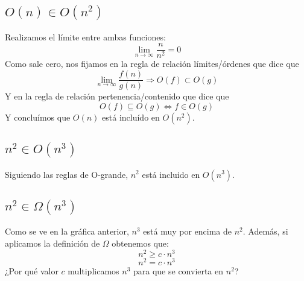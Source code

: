 \begin{twocolumn}
\subsection{$O(n) \in O(n^2)$}

Realizamos el límite entre ambas funciones:
\begin{displaymath}
\lim_{n \rightarrow \infty} \frac{n}{n^2} = 0
\end{displaymath}
Como sale cero, nos fijamos en la regla de relación límites/órdenes que dice que
\begin{displaymath}
\lim_{n \rightarrow \infty} \frac{f(n)}{g(n)} \Longrightarrow O(f) \subset O(g)
\end{displaymath}
Y en la regla de relación pertenencia/contenido que dice que
\begin{displaymath}
O(f) \subseteq O(g) \Longleftrightarrow f \in O(g)
\end{displaymath}
Y concluímos que $O(n)$ está incluído en $O(n^2)$.

\subsection{$n^2 \in O(n^3)$}


Siguiendo las reglas de O-grande, $n^2$ está incluido en $O(n^3)$.


\subsection{$n^2 \in \Omega(n^3)$}

Como se ve en la gráfica anterior, $n^3$ está muy por encima de $n^2$. Además, si aplicamos la definición de $\Omega$ obtenemos que:
\begin{displaymath}
n^2 \geq c \cdot n^3
\end{displaymath}
\begin{displaymath}
n^2 = c \cdot n^3
\end{displaymath}
¿Por qué valor $c$ multiplicamos $n^3$ para que se convierta en $n^2$?


\end{twocolumn}
